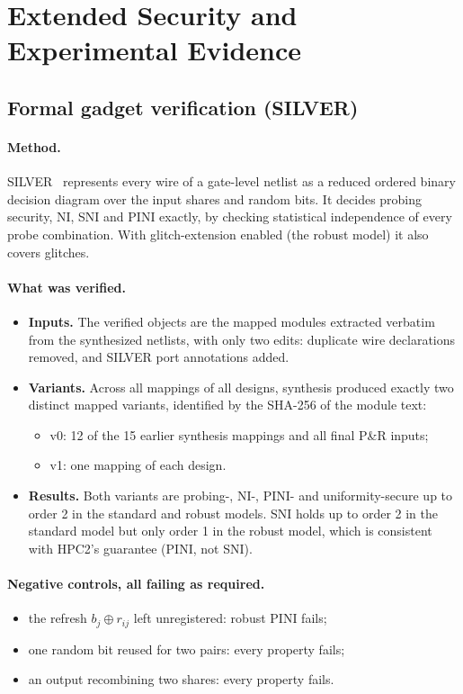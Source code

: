 \section{Extended Security and Experimental Evidence}\label{app:evidence}

\subsection{Formal gadget verification (SILVER)}\label{app:silver}
\paragraph{Method.} SILVER~\cite{knichel2020silver} represents every wire of a gate-level netlist as a reduced ordered binary decision diagram over the input shares and random bits. It decides probing security, NI, SNI and PINI exactly, by checking statistical independence of every probe combination. With glitch-extension enabled (the robust model) it also covers glitches.

\paragraph{What was verified.}
\begin{itemize}
  \item \textbf{Inputs.} The verified objects are the mapped  modules extracted verbatim from the synthesized netlists, with only two edits: duplicate wire declarations removed, and SILVER port annotations added.
  \item \textbf{Variants.} Across all mappings of all designs, synthesis produced exactly two distinct mapped variants, identified by the SHA-256 of the module text:
  \begin{itemize}
    \item v0: 12 of the 15 earlier synthesis mappings and all final P\&R inputs;
    \item v1: one mapping of each design.
  \end{itemize}
  \item \textbf{Results.} Both variants are probing-, NI-, PINI- and uniformity-secure up to order 2 in the standard and robust models. SNI holds up to order 2 in the standard model but only order 1 in the robust model, which is consistent with HPC2's guarantee (PINI, not SNI).
\end{itemize}

\paragraph{Negative controls, all failing as required.}
\begin{itemize}
  \item the refresh $b_j \oplus r_{ij}$ left unregistered: robust PINI fails;
  \item one random bit reused for two pairs: every property fails;
  \item an output recombining two shares: every property fails.
\end{itemize}

